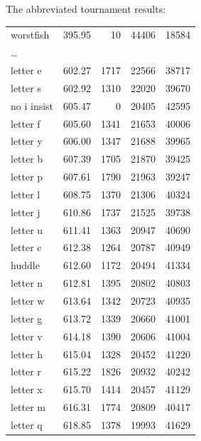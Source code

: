 \documentclass[twocolumn]{article}
\begin{document}
The abbreviated tournament results:
{
\scriptsize
\begin{center}

\tablelasttail{%
}
\begin{supertabular}{lrrrr}
worstfish & 395.95 & 10 & 44406 & 18584 \\
\ldots \\
letter e &  602.27 &  1717 & 22566 & 38717 \\
letter s &  602.92 &  1310 & 22020 & 39670 \\
no i insist & 605.47 & 0 & 20405 & 42595 \\
letter f & 605.60 & 1341 & 21653 & 40006 \\
letter y & 606.00 & 1347 & 21688 & 39965 \\
letter b & 607.39 & 1705 & 21870 & 39425 \\
letter p & 607.61 & 1790 & 21963 & 39247 \\
letter l & 608.75 & 1370 & 21306 & 40324 \\
letter j & 610.86 & 1737 & 21525 & 39738 \\
letter u & 611.41 & 1363 & 20947 & 40690 \\
letter c & 612.38 & 1264 & 20787 & 40949 \\
huddle & 612.60 & 1172 & 20494 & 41334 \\
letter n & 612.81 & 1395 & 20802 & 40803 \\
letter w & 613.64 & 1342 & 20723 & 40935 \\
letter g & 613.72 & 1339 & 20660 & 41001 \\
letter v & 614.18 & 1390 & 20606 & 41004 \\
letter h & 615.04 & 1328 & 20452 & 41220 \\
letter r & 615.22 & 1826 & 20932 & 40242 \\
letter x & 615.70 & 1414 & 20457 & 41129 \\
letter m & 616.31 & 1774 & 20809 & 40417 \\
letter q & 618.85 & 1378 & 19993 & 41629 \\

\end{supertabular}
\end{center}}
\end{document}

